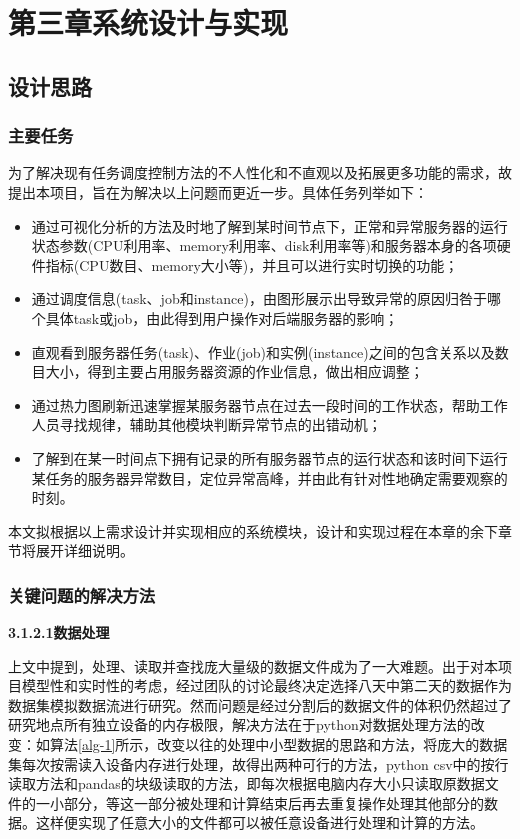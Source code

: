 \chapter{第三章\quad 系统设计与实现}
\section{设计思路}
\subsection{主要任务}

为了解决现有任务调度控制方法的不人性化和不直观以及拓展更多功能的需求，故提出本项目，旨在为解决以上问题而更近一步。具体任务列举如下：

\begin{itemize}
	\item 通过可视化分析的方法及时地了解到某时间节点下，正常和异常服务器的运行状态参数(CPU利用率、memory利用率、disk利用率等)和服务器本身的各项硬件指标(CPU数目、memory大小等)，并且可以进行实时切换的功能；
	\item 通过调度信息(task、job和instance)，由图形展示出导致异常的原因归咎于哪个具体task或job，由此得到用户操作对后端服务器的影响；
	\item 直观看到服务器任务(task)、作业(job)和实例(instance)之间的包含关系以及数目大小，得到主要占用服务器资源的作业信息，做出相应调整；
	\item 通过热力图刷新迅速掌握某服务器节点在过去一段时间的工作状态，帮助工作人员寻找规律，辅助其他模块判断异常节点的出错动机；
	\item 了解到在某一时间点下拥有记录的所有服务器节点的运行状态和该时间下运行某任务的服务器异常数目，定位异常高峰，并由此有针对性地确定需要观察的时刻。
\end{itemize}

本文拟根据以上需求设计并实现相应的系统模块，设计和实现过程在本章的余下章节将展开详细说明。

\subsection{关键问题的解决方法}

{\textbf{3.1.2.1\quad 数据处理}}

上文中提到，处理、读取并查找庞大量级的数据文件成为了一大难题。出于对本项目模型性和实时性的考虑，经过团队的讨论最终决定选择八天中第二天的数据作为数据集模拟数据流进行研究。然而问题是经过分割后的数据文件的体积仍然超过了研究地点所有独立设备的内存极限，解决方法在于python对数据处理方法的改变：如算法\ref{alg-1}所示，改变以往的处理中小型数据的思路和方法，将庞大的数据集每次按需读入设备内存进行处理，故得出两种可行的方法，python csv中的按行读取方法和pandas的块级读取的方法，即每次根据电脑内存大小只读取原数据文件的一小部分，等这一部分被处理和计算结束后再去重复操作处理其他部分的数据。这样便实现了任意大小的文件都可以被任意设备进行处理和计算的方法。

